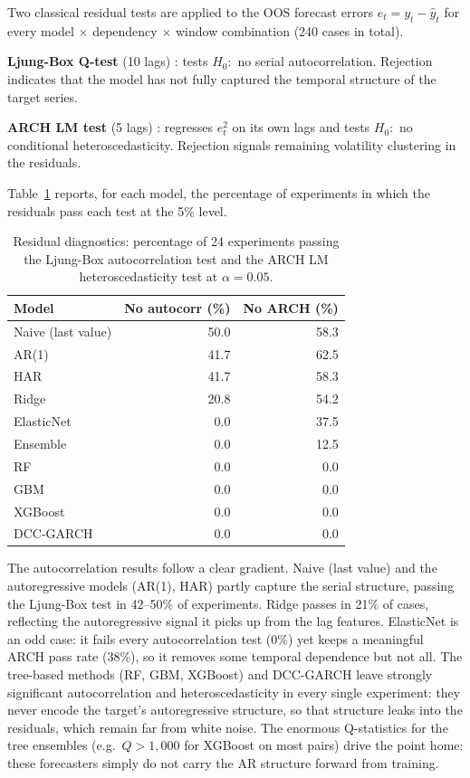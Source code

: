 Two classical residual tests are applied to the OOS forecast errors
$e_t = y_t - \hat{y}_t$ for every model $\times$ dependency $\times$ window
combination (240 cases in total).

\textbf{Ljung-Box Q-test} (10 lags) \cite{ljung1978measure}: tests $H_0{:}$ no serial autocorrelation.
Rejection indicates that the model has not fully captured the temporal structure
of the target series.

\textbf{ARCH LM test} (5 lags) \cite{engle1982arch}: regresses $e_t^2$ on its own lags and tests
$H_0{:}$ no conditional heteroscedasticity.
Rejection signals remaining volatility clustering in the residuals.

Table~\ref{tab:resid_summary} reports, for each model, the percentage of
experiments in which the residuals pass each test at the 5\% level.

\begin{table}[H]
    \centering
    \caption{Residual diagnostics: percentage of 24 experiments passing the
             Ljung-Box autocorrelation test and the ARCH LM heteroscedasticity
             test at $\alpha = 0.05$.}
    \label{tab:resid_summary}
    \begin{tabular}{lrr}
        \toprule
        Model & No autocorr (\%) & No ARCH (\%) \\
        \midrule
        Naive (last value) & 50.0 & 58.3 \\
        AR(1)         & 41.7 & 62.5 \\
        HAR         & 41.7 & 58.3 \\
        Ridge       & 20.8 & 54.2 \\
        ElasticNet  &  0.0 & 37.5 \\
        Ensemble    &  0.0 & 12.5 \\
        RF          &  0.0 &  0.0 \\
        GBM         &  0.0 &  0.0 \\
        XGBoost    &  0.0 &  0.0 \\
        DCC-GARCH  &  0.0 &  0.0 \\
        \bottomrule
    \end{tabular}
\end{table}

The autocorrelation results follow a clear gradient. Naive (last value) and the
autoregressive models (AR(1), HAR) partly capture the serial structure,
passing the Ljung-Box test in 42--50\% of experiments. Ridge passes in
21\% of cases, reflecting the autoregressive signal it picks up from the
lag features. ElasticNet is an odd case: it fails every autocorrelation
test (0\%) yet keeps a meaningful ARCH pass rate (38\%), so it removes some
temporal dependence but not all. The tree-based methods (RF, GBM, XGBoost)
and DCC-GARCH leave strongly significant autocorrelation and
heteroscedasticity in every single experiment: they never encode the
target's autoregressive structure, so that structure leaks into the
residuals, which remain far from white noise. The enormous Q-statistics for
the tree ensembles (e.g.\ $Q > 1{,}000$ for XGBoost on most pairs) drive the
point home: these forecasters simply do not carry the AR structure forward
from training.


